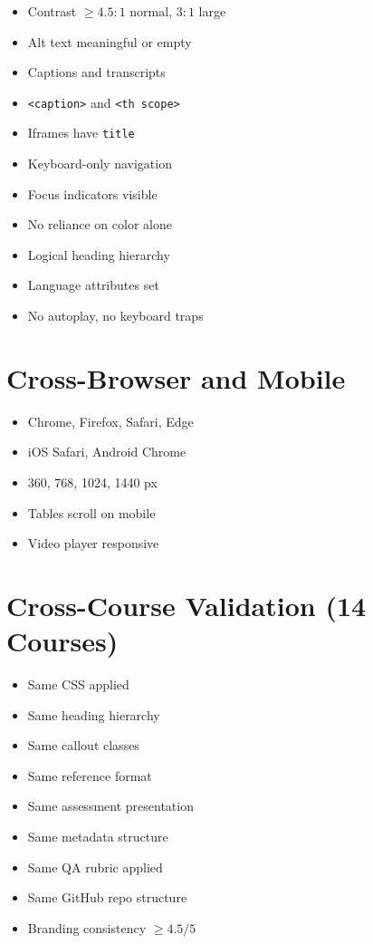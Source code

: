 \begin{itemize}
  \item[$\square$] Contrast $\geq 4.5{:}1$ normal, $3{:}1$ large
  \item[$\square$] Alt text meaningful or empty
  \item[$\square$] Captions and transcripts
  \item[$\square$] \texttt{<caption>} and \texttt{<th scope>}
  \item[$\square$] Iframes have \texttt{title}
  \item[$\square$] Keyboard-only navigation
  \item[$\square$] Focus indicators visible
  \item[$\square$] No reliance on color alone
  \item[$\square$] Logical heading hierarchy
  \item[$\square$] Language attributes set
  \item[$\square$] No autoplay, no keyboard traps
\end{itemize}

\section{Cross-Browser and Mobile}

\begin{itemize}
  \item[$\square$] Chrome, Firefox, Safari, Edge
  \item[$\square$] iOS Safari, Android Chrome
  \item[$\square$] 360, 768, 1024, 1440 px
  \item[$\square$] Tables scroll on mobile
  \item[$\square$] Video player responsive
\end{itemize}

\section{Cross-Course Validation (14 Courses)}

\begin{itemize}
  \item[$\square$] Same CSS applied
  \item[$\square$] Same heading hierarchy
  \item[$\square$] Same callout classes
  \item[$\square$] Same reference format
  \item[$\square$] Same assessment presentation
  \item[$\square$] Same metadata structure
  \item[$\square$] Same QA rubric applied
  \item[$\square$] Same GitHub repo structure
  \item[$\square$] Branding consistency $\geq 4.5/5$
\end{itemize}